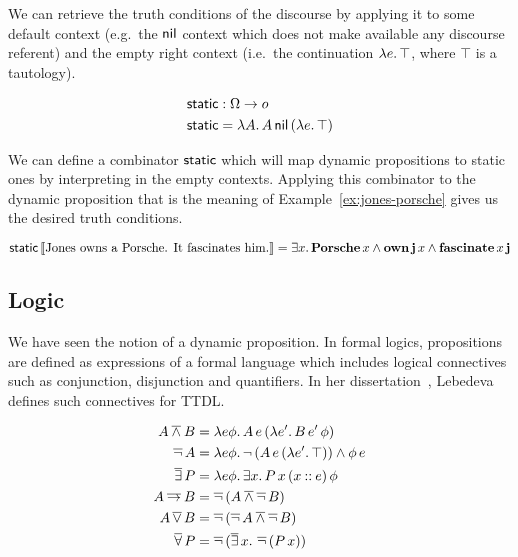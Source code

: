 We can retrieve the truth conditions of the discourse by applying it to
some default context (e.g.\ the $\textsf{nil}$ context which does not make
available any discourse referent) and the empty right context (i.e.\ the
continuation $\lambda e.\, \top$, where $\top$ is a tautology).

\begin{align*}
\textsf{static} &: \Omega \to o \\
\textsf{static} &= \lambda A.\, A\,\textsf{nil}\,(\lambda e.\, \top)
\end{align*}

We can define a combinator $\textsf{static}$ which will map dynamic propositions to
static ones by interpreting in the empty contexts. Applying this combinator
to the dynamic proposition that is the meaning of
Example~\ref{ex:jones-porsche} gives us the desired truth conditions.

$$
\textsf{static}\,\llbracket \text{Jones owns a Porsche. It fascinates him.} \rrbracket
= \exists x.\, \textbf{Porsche}\,x \land
  \textbf{own}\,\textbf{j}\,x \land \textbf{fascinate}\,x\,\textbf{j}
$$


\subsection{Logic}
\label{ssec:ttdl-logic}

We have seen the notion of a dynamic proposition. In formal logics,
propositions are defined as expressions of a formal language which includes
logical connectives such as conjunction, disjunction and quantifiers. In
her dissertation~\cite{lebedeva2012expression}, Lebedeva defines such
connectives for TTDL.

\begin{align*}
  A \mathbin{\overline{\land}} B &= \lambda e \phi.\, A\,e\,(\lambda e'.\, B\,e'\,\phi) \\
  \mathop{\overline{\lnot}} A &= \lambda e \phi.\, \lnot\,(A\,e\,(\lambda e'.\, \top)) \land \phi\,e \\
  \mathop{\overline{\exists}} P &= \lambda e \phi.\, \exists x.\, P\,x\,(x \mathbin{::} e)\,\phi \\
  A \mathbin{\overline{\to}} B &= \mathop{\overline{\lnot}}\,(A \mathbin{\overline{\land}} \mathop{\overline{\lnot}} B) \\
  A \mathop{\overline{\lor}} B &= \mathop{\overline{\lnot}}\,(\mathop{\overline{\lnot}} A \mathbin{\overline{\land}} \mathop{\overline{\lnot}} B) \\
  \mathop{\overline{\forall}} P &= \mathop{\overline{\lnot}}\,(\mathop{\overline{\exists}} x.\, \mathop{\overline{\lnot}}\,(P\,x))
\end{align*}

